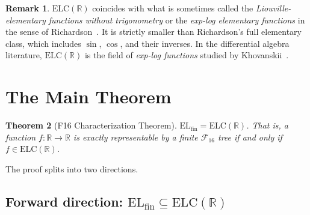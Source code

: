 \documentclass[12pt,a4paper]{article}
\newtheorem{theorem}{Theorem}[section]
\theoremstyle{definition}
\newtheorem{remark}[theorem]{Remark}
\newcommand{\F}{\mathcal{F}_{16}}
\newcommand{\ELfin}{\mathrm{EL}_{\mathrm{fin}}}
\newcommand{\ELC}{\mathrm{ELC}(\mathbb{R})}
\newcommand{\R}{\mathbb{R}}
\begin{document}
\begin{remark}
$\ELC$ coincides with what is sometimes called the \emph{Liouville-elementary
functions without trigonometry} or the \emph{exp-log elementary functions} in
the sense of Richardson~\cite{Richardson1968}.  It is strictly smaller than
Richardson's full elementary class, which includes $\sin$, $\cos$, and their
inverses.  In the differential algebra literature, $\ELC$ is the field of
\emph{exp-log functions} studied by Khovanskii~\cite{Khovanskii1991}.
\end{remark}

\section{The Main Theorem}
\label{sec:main}

\begin{theorem}[F16 Characterization Theorem]
\label{thm:main}
$\ELfin = \ELC$.  That is, a function $f:\R\to\R$ is exactly representable by
a finite $\F$ tree if and only if $f\in\ELC$.
\end{theorem}

The proof splits into two directions.

\subsection{Forward direction: \texorpdfstring{$\ELfin\subseteq\ELC$}{ELfin ⊆ ELC}}
\label{ssec:forward}
\end{document}
